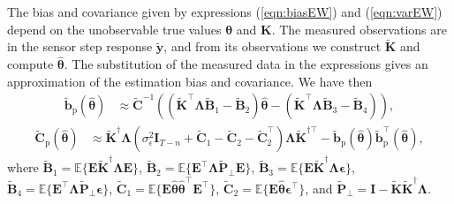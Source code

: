The bias and covariance given by expressions (\ref{eqn:biasEW}) and (\ref{eqn:varEW}) depend on the unobservable true values $\bm{\theta}$ and $\mathbf{K}$.
The measured observations are in the sensor step response $\widetilde{\mathbf{y}}$, and from its observations we construct $\widetilde{\mathbf{K}}$ and compute $\widehat{\bm{\theta}}$.
The substitution of the measured data in the expressions gives an approximation of the estimation bias and covariance. 
We have then
\begin{equation} \begin{aligned} \widetilde{\mathbf{b}}_{\mathrm{p}} \left( \widehat{\bm{\theta}} \right) & \approx \widetilde{\mathbf{C}}^{-1} \left(  \left( \widetilde{\mathbf{K}}^\top \bm{\Lambda} \widetilde{\mathbf{B}}_1 - \widetilde{\mathbf{B}}_2 \right) \widehat{\bm{\theta}} - \left( \widetilde{\mathbf{K}}^\top \bm{\Lambda} \widetilde{\mathbf{B}}_3 - \widetilde{\mathbf{B}}_4 \right) \right), \end{aligned} \label{eqn:biasSTW} \end{equation}
  \begin{equation} \begin{aligned} \widetilde{\mathbf{C}}_{\mathrm{p}} \left( \widehat{\bm{\theta}} \right) & \approx \widetilde{\mathbf{K}}^\dagger \bm{\Lambda} \left( \sigma_{\epsilon}^2 \mathbf{I}_{T-n} + \widetilde{\mathbf{C}}_1 - \widetilde{\mathbf{C}}_2 - \widetilde{\mathbf{C}}_2^\top \right) \bm{\Lambda} \widetilde{\mathbf{K}}^{\dagger \top} - \widetilde{\mathbf{b}}_{\mathrm{p}} \left( \widehat{\bm{\theta}} \right) \widetilde{\mathbf{b}}_{\mathrm{p}}^\top \left( \widehat{\bm{\theta}} \right), \end{aligned} \label{eqn:varSTW} \end{equation}
  where $\widetilde{\mathbf{B}}_1 = \mathbb{E} \Big\{ \mathbf{E} \widetilde{\mathbf{K}}^\dagger \bm{\Lambda} \mathbf{E} \Big\}$, $\widetilde{\mathbf{B}}_2 = \mathbb{E} \Big\{ \mathbf{E}^\top \bm{\Lambda} \widetilde{\mathbf{P}}_\perp \mathbf{E} \Big\}$, $\widetilde{\mathbf{B}}_3 = \mathbb{E} \Big\{ \mathbf{E} \widetilde{\mathbf{K}}^\dagger \bm{\Lambda} \bm{\epsilon} \Big\}$, $\widetilde{\mathbf{B}}_4 = \mathbb{E} \Big\{ \mathbf{E}^\top \bm{\Lambda} \widetilde{\mathbf{P}}_\perp \bm{\epsilon} \Big\}$, $\widetilde{\mathbf{C}}_1 = \mathbb{E} \Big\{ \mathbf{E} \widehat{\bm{\theta}} \widehat{\bm{\theta}}^\top \mathbf{E}^\top \Big\}$, $\widetilde{\mathbf{C}}_2 = \mathbb{E} \Big\{ \mathbf{E} \widehat{\bm{\theta}} \bm{\epsilon}^\top \Big\}$, and $\widetilde{\mathbf{P}}_\perp = \mathbf{I} - \widetilde{\mathbf{K}} \widetilde{\mathbf{K}}^\dagger \bm{\Lambda}$. 

